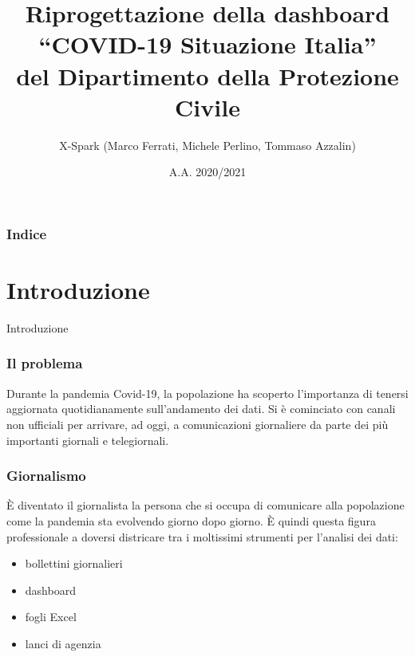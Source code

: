 \documentclass[handout]{beamer}
\title[Riprogettazione della dashboard\\``COVID-19 Situazione Italia'']{Riprogettazione della dashboard\\``COVID-19 Situazione Italia''\\del Dipartimento della Protezione Civile}
\author{X-Spark (Marco Ferrati, Michele Perlino, Tommaso Azzalin)}
\institute[UniBo]{LM Informatica\\
Università di Bologna - Alma Mater Studiorum}
\date{A.A. 2020/2021}
\begin{document}
	\begin{frame}[plain]
	  \titlepage
	\end{frame}
	\begin{frame}
  		\frametitle{Indice}
		\tableofcontents
	\end{frame}
	
	\section{Introduzione}
	\begin{frame}
		\centering
		\begin{Huge}
			Introduzione
		\end{Huge}
		\end{frame}

		\begin{frame}
			\frametitle{Il problema}
			Durante la pandemia Covid-19, la popolazione ha scoperto l'importanza di tenersi aggiornata quotidianamente sull'andamento dei dati.\newline \newline
			Si è cominciato con canali non ufficiali per arrivare, ad oggi, a comunicazioni giornaliere da parte dei più importanti giornali e telegiornali.
		\end{frame}

		\begin{frame}
			\frametitle{Giornalismo}
			\`E diventato il giornalista la persona che si occupa di comunicare alla popolazione come la pandemia sta evolvendo giorno dopo giorno.\newline \newline
			\`E quindi questa figura professionale a doversi districare tra i moltissimi strumenti per l'analisi dei dati:
			\begin{itemize}[<+->]
				\item bollettini giornalieri\\
				\item dashboard\\
				\item fogli Excel\\
				\item lanci di agenzia\\
			\end{itemize}
		\end{frame}
\end{document}
